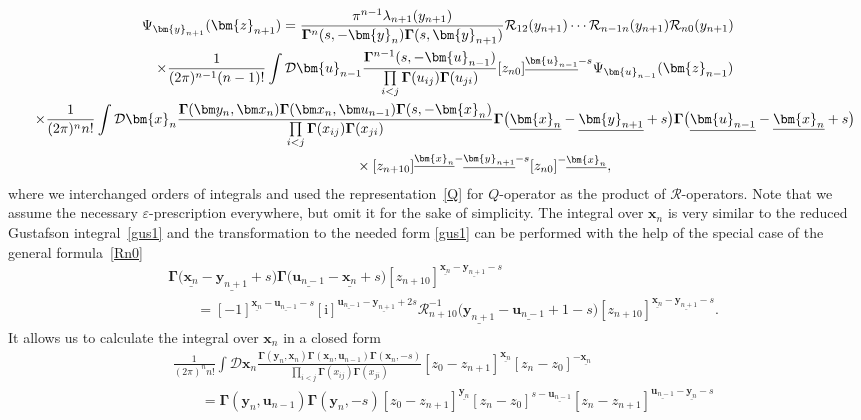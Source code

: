 \documentclass[10pt,a4paper]{amsart}
\renewcommand{\imath}{\mathrm{i}}
\numberwithin{equation}{section}
\begin{document}
\begin{gather*}
\Psi_{\bm{y}_{n+1}}(\bm{z}_{n+1}) =
\frac{\pi^{n-1} \lambda_{n+1}(y_{n+1})}{\mathbf{\Gamma}^{n}(s ,-\bm{y}_{n})
\mathbf{\Gamma}(s ,\bm{y}_{n+1})}
\mathcal{R}_{12}(y_{n+1})\cdots
\mathcal{R}_{n-1 n}(y_{n+1})\mathcal{R}_{n 0}(y_{n+1})\\
\quad \times \frac{1}{(2\pi)^{n-1} (n-1)!} \int \mathcal{D}\bm{u}_{n-1}
\frac{\mathbf{\Gamma}^{n-1}(s ,-\bm{u}_{n-1})}
{\prod\limits_{i<j}\mathbf{\Gamma}(u_{ij})\mathbf{\Gamma}(u_{ji})}
[z_{n 0}]^{\underline{\bm{u}_{n-1}}-s}
\Psi_{\bm{u}_{n-1}}(\bm{z}_{n-1})
\\
\quad\times \frac{1}{(2\pi)^n n!} \int \mathcal{D}\bm{x}_{n}
\frac{\mathbf{\Gamma}(\bm y_{n},\bm x_{n})
\mathbf{\Gamma}(\bm x_{n},\bm u_{n-1})
\mathbf{\Gamma}(s ,-\bm{x}_{n})}
{\prod\limits_{i<j}\mathbf{\Gamma}(x_{ij})\mathbf{\Gamma}(x_{ji})}
\mathbf{\Gamma}\bigl(\underline{\bm{x}_{n}}-\underline{\bm{y}_{n+1}}+s\bigr)
\mathbf{\Gamma}\bigl(\underline{\bm{u}_{n-1}}-\underline{\bm{x}_{n}}+s\bigr)\\
\quad\hphantom{\times \frac{1}{(2\pi)^n n!} \int}{}\times [z_{n+1 0}]^{\underline{\bm{x}_{n}}-\underline{\bm{y}_{n+1}}-s}
[z_{n 0}]^{-\underline{\bm{x}_{n}}} ,
\end{gather*}
where we interchanged orders of integrals and used the
representation~\eqref{Q} for $Q$-operator as the product
of $\mathcal{R}$-operators.
Note that we assume the necessary $\varepsilon$-prescription everywhere, but omit it for the sake of simplicity.
The integral over $\bm{x}_{n}$ is very similar to the reduced Gustafson
integral~\eqref{gus1} and the transformation to the needed form
\eqref{gus1} can be performed with the help of the
special case of the general formula~\eqref{Rn0}
\begin{align*}
&
\mathbf{\Gamma}\bigl(\underline{\bm{x}_{n}}-\underline{\bm{y}_{n+1}}+s\bigr)
\mathbf{\Gamma}\bigl(\underline{\bm{u}_{n-1}}-\underline{\bm{x}_{n}}+s\bigr)
[z_{n+1 0}]^{\underline{\bm{x}_{n}}-\underline{\bm{y}_{n+1}}-s} \\
& \qquad =
[-1]^{\underline{\bm{x}_{n}}-\underline{\bm{u}_{n-1}}-s}
[\imath]^{\underline{\bm{u}_{n-1}}-\underline{\bm{y}_{n+1}}+2s}
\mathcal{R}^{-1}_{n+1 0}
\bigl(\underline{\bm{y}_{n+1}}-\underline{\bm{u}_{n-1}}+1-s\bigr)
[z_{n+1 0}]^{\underline{\bm{x}_{n}}-\underline{\bm{y}_{n+1}}-s} .
\end{align*}
It allows us to calculate the integral over $\bm{x}_{n}$
in a closed form
\begin{align*}
&
\frac{1}{(2\pi)^n n!} \int \mathcal{D}\bm{x}_{n}
\frac{\mathbf{\Gamma}(\bm y_{n},\bm x_{n})
\mathbf{\Gamma}(\bm x_{n},\bm u_{n-1})
\mathbf{\Gamma}(\bm{x}_{n} ,-s)}
{\prod\limits_{i<j}\mathbf{\Gamma}(x_{ij})\mathbf{\Gamma}(x_{ji})}
[z_0 -z_{n+1}]^{\underline{\bm{x}_{n}}}
[z_n-z_{0}]^{-\underline{\bm{x}_{n}}} \\
& \qquad =
\mathbf{\Gamma}(\bm y_{n},\bm u_{n-1})
\mathbf{\Gamma}(\bm{y}_{n} ,-s)
[z_0 - z_{n+1}]^{\underline{\bm{y}_{n}}}
[z_{n}-z_0]^{s-\underline{\bm{u}_{n-1}}}
[z_n-z_{n+1}]^{\underline{\bm{u}_{n-1}}-\underline{\bm{y}_{n}}-s}
\end{align*}
\end{document}

